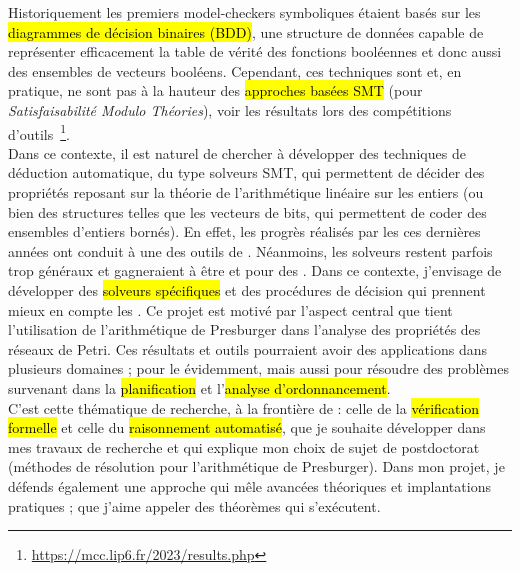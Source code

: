 Historiquement les premiers model-checkers symboliques étaient basés sur les
\hl{diagrammes de décision binaires (BDD)}, une structure de données capable de
représenter efficacement la table de vérité des fonctions booléennes et donc
aussi des ensembles de vecteurs booléens. Cependant, ces techniques sont
 et, en pratique, ne sont pas à la hauteur des
\hl{approches basées SMT} (pour \emph{Satisfaisabilité Modulo Théories}), voir
les résultats lors des compétitions
d'outils~\footnote{\url{https://mcc.lip6.fr/2023/results.php}}.\\

Dans ce contexte, il est naturel de chercher à développer des techniques de
déduction automatique, du type solveurs SMT, qui permettent de décider des
propriétés reposant sur la théorie de l'arithmétique linéaire sur les entiers
(ou bien des structures telles que les vecteurs de bits, qui permettent de coder
des ensembles d'entiers bornés).
En effet, les progrès réalisés par les  ces dernières années
ont conduit à une  des outils de .
Néanmoins, les solveurs restent parfois trop généraux et gagneraient à être
 et  pour des . Dans ce
contexte, j'envisage de développer des \hl{solveurs spécifiques} et des
procédures de décision qui prennent mieux en compte les . Ce projet est motivé par l'aspect central que tient l'utilisation de
l'arithmétique de Presburger dans l'analyse des propriétés des réseaux de Petri.
Ces résultats et outils pourraient avoir des applications dans plusieurs
domaines ; pour le  évidemment, mais aussi pour résoudre des
problèmes survenant dans la \hl{planification} et l'\hl{analyse
d'ordonnancement}.\\

C'est cette thématique de recherche, à la frontière de  :
celle de la \hl{vérification formelle} et celle du \hl{raisonnement automatisé},
que je souhaite développer dans mes travaux de recherche et qui explique mon
choix de sujet de postdoctorat (méthodes de résolution pour l'arithmétique de
Presburger). Dans mon projet, je défends également une approche qui mêle
avancées théoriques et implantations pratiques ; que j'aime appeler des \og
théorèmes qui s'exécutent\fg.\\




